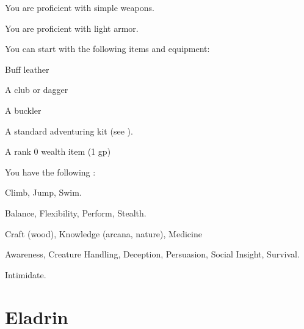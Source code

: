       You are proficient with simple weapons.

      You are proficient with light armor.

    You can start with the following items and equipment:

    \begin{raggeditemize}
        \item Buff leather
        \item A club or dagger
        \item A buckler
        \item A standard adventuring kit (see ).
        \item A rank 0 wealth item (1 gp)
    \end{raggeditemize}

      You have the following :
      \begin{raggeditemize}
        \item {} Climb, Jump, Swim.
        \item {} Balance, Flexibility, Perform, Stealth.
        \item {} Craft (wood), Knowledge (arcana, nature), Medicine
        \item {} Awareness, Creature Handling, Deception, Persuasion, Social Insight, Survival.
        \item {} Intimidate.
      \end{raggeditemize}

\section{Eladrin}

